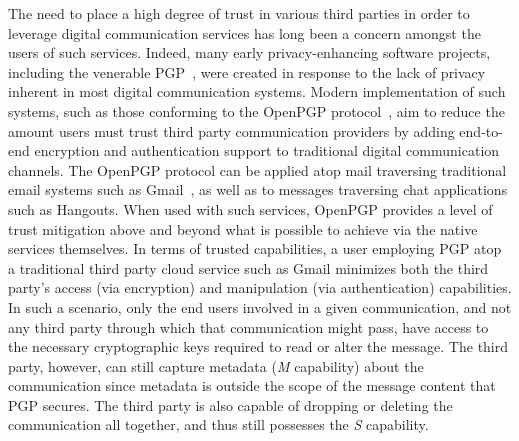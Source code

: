 The need to place a high degree of trust in various third parties in
order to leverage digital communication services has long been a
concern amongst the users of such services. Indeed, many early
privacy-enhancing software projects, including the venerable
PGP~\cite{zimmermann-pgpsource, zimmermann-pgp10}, were created in
response to the lack of privacy inherent in most digital communication
systems. Modern implementation of such systems, such as those
conforming to the OpenPGP protocol~\cite{callas2007}, aim to reduce
the amount users must trust third party communication providers by
adding end-to-end encryption and authentication support to traditional
digital communication channels. The OpenPGP protocol can be applied
atop mail traversing traditional email systems such as
Gmail~\cite{google-endtoend}, as well as to messages traversing chat
applications such as Hangouts. When used with such services, OpenPGP
provides a level of trust mitigation above and beyond what is possible
to achieve via the native services themselves. In terms of trusted
capabilities, a user employing PGP atop a traditional third party
cloud service such as Gmail minimizes both the third party's access
(via encryption) and manipulation (via authentication)
capabilities. In such a scenario, only the end users involved in a
given communication, and not any third party through which that
communication might pass, have access to the necessary cryptographic
keys required to read or alter the message. The third party, however,
can still capture metadata (\emph{M} capability) about the
communication since metadata is outside the scope of the message
content that PGP secures. The third party is also capable of dropping
or deleting the communication all together, and thus still possesses
the \emph{S} capability.

